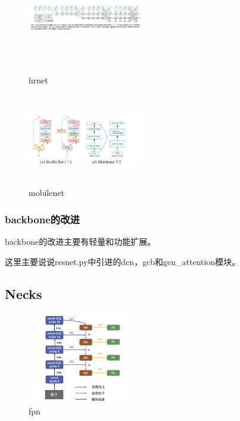 \documentclass[UTF8]{ctexart}
\begin{document}
\begin{figure}[htbp]
	\centering
	\begin{minipage}[t]{0.48\textwidth}
	\centering
	\includegraphics[width=5cm, height=4cm]{./pic/HRNet.png}
	\caption{hrnet}
	\label{pichrnet}
	\end{minipage}
	\begin{minipage}[t]{0.48\textwidth}
		\centering
		\includegraphics[width=5cm,height=4cm]{./pic/MobileNetV2.png}
		\caption{mobilenet}
		\label{picmobilenet}
	\end{minipage}
\end{figure}


\subsubsection{backbone的改进}
backbone的改进主要有轻量和功能扩展。

这里主要说说resnet.py中引进的dcn，gcb和gen\_attention模块。
\subsection{Necks}
\begin{figure}[htbp]
	\centering
	\includegraphics[width=5cm,height=4cm]{./pic/fpn.png}
	\caption{fpn}
	\label{picfpn}
\end{figure}
\end{document}
